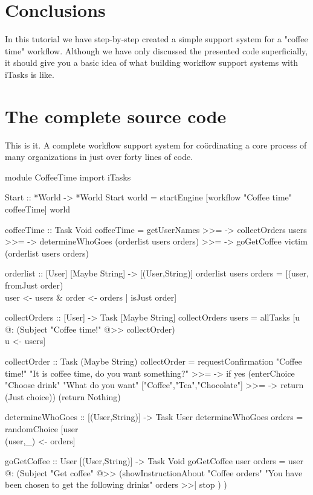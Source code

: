 \documentclass[a4paper,11pt]{article}
\begin{document}
\section{Conclusions}
In this tutorial we have step-by-step created a simple support system for a "coffee time" workflow. Although we have only discussed the presented code superficially, it should give you a basic idea of what  building workflow support systems with iTasks is like.
\appendix
\newpage
\section{The complete source code}
This is it. A complete workflow support system for co\"ordinating a core process of many organizations in just over forty lines of code.
\begin{CleanCode}
module CoffeeTime
import iTasks

Start :: *World -> *World
Start world = startEngine [workflow "Coffee time" coffeeTime] world

coffeeTime :: Task Void
coffeeTime
	=   getUserNames
	>>= \users ->  collectOrders users
	>>= \orders -> determineWhoGoes (orderlist users orders)
	>>= \victim -> goGetCoffee victim (orderlist users orders)

orderlist :: [User] [Maybe String] -> [(User,String)]
orderlist users orders
	= [(user, fromJust order) \\ user <- users & order <- orders | isJust order]

collectOrders :: [User] -> Task [Maybe String]
collectOrders users 
	= allTasks [u @: (Subject "Coffee time!" @>> collectOrder) \\ u <- users]

collectOrder :: Task (Maybe String)
collectOrder
	= requestConfirmation "Coffee time!" "It is coffee time, do you want something?"
	>>= \yes -> if yes
		(enterChoice "Choose drink" "What do you want" ["Coffee","Tea","Chocolate"]
		>>= \choice -> return (Just choice))
		(return Nothing)

determineWhoGoes :: [(User,String)] -> Task User
determineWhoGoes orders = randomChoice [user \\ (user,_) <- orders]

goGetCoffee :: User [(User,String)] -> Task Void
goGetCoffee user orders
	= user @:
	(Subject "Get coffee" @>> 
		(showInstructionAbout 
			"Coffee orders"
			"You have been chosen to get the following drinks"
			orders
			>>| stop
		)                        
	)

\end{CleanCode}
\end{document}
